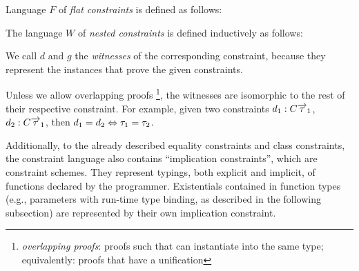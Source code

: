 \begin{defn}
    \label{def:defer_constr}

    Language $F$ of \emph{flat constraints} is defined as follows:

    \begin{center}\begin{grammar}
    \end{grammar}\end{center}

    The language $W$ of \emph{nested constraints} is defined inductively as follows:

    \begin{center}\begin{grammar}
    \end{grammar}\end{center}

    \label{constraint_language}
\end{defn}

We call $d$ and $g$ the \emph{witnesses} of the corresponding constraint, because they represent the instances that prove the given constraints.

Unless we allow overlapping proofs \footnote{\emph{overlapping proofs}: proofs such that can instantiate into the same type; equivalently: proofs that have a unification}, the witnesses are isomorphic to the rest of their respective constraint. For example, given two constraints $d_1: C \overrightarrow{\tau}_1$, $d_2: C \overrightarrow{\tau}_1$, then $d_1 = d_2 \Leftrightarrow \tau_1 = \tau_2$.

Additionally, to the already described equality constraints and class constraints, the constraint language also contains ``implication constraints'', which are constraint schemes. They represent typings, both explicit and implicit, of functions declared by the programmer. Existentials contained in function types (e.g., parameters with run-time type binding, as described in the following subsection) are represented by their own implication constraint.

